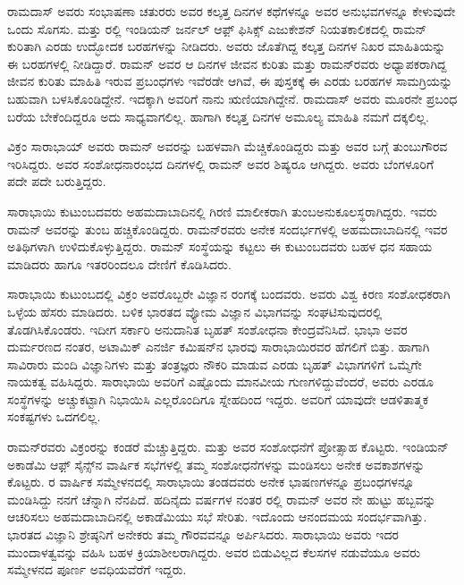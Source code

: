 ರಾಮದಾಸ್ ಅವರು ಸಂಭಾಷಣಾ ಚತುರರು ಅವರ ಕಲ್ಕತ್ತ ದಿನಗಳ ಕಥೆಗಳನ್ನೂ ಅವರ ಅನುಭವಗಳನ್ನೂ ಕೇಳುವುದೇ ಒಂದು ಸೊಗಸು.  ಮತ್ತು ರಲ್ಲಿ ಇಂಡಿಯನ್ ಜರ್ನಲ್ ಆಫ಼್ ಫಿಸಿಕ್ಸ್ ಎಜುಕೇಶನ್ ನಿಯತಕಾಲಿಕದಲ್ಲಿ ರಾಮನ್ ಕುರಿತಾಗಿ ಎರಡು ಉದ್ಭೋದಕ ಬರಹಗಳನ್ನು ನೀಡಿದರು. ಅವರು ಜೊತೆಗಿದ್ದ ಕಲ್ಕತ್ತ ದಿನಗಳ ನಿಖರ ಮಾಹಿತಿಯನ್ನು ಈ ಬರಹಗಳಲ್ಲಿ ನೀಡಿದ್ದಾರೆ. ರಾಮನ್ ಅವರ ಆ ದಿನಗಳ ಜೀವನ ಕುರಿತು ಮತ್ತು ರಾಮನ್‍ರವರು ಅಧ್ಯಾಪಕರಾಗಿದ್ದ ಜೀವನ ಕುರಿತು ಮಾಹಿತಿ ಇರುವ ಪ್ರಬಂಧಗಳು ಇವೆರಡೇ ಆಗಿವೆ, ಈ ಪುಸ್ತಕಕ್ಕೆ ಈ ಎರಡು ಬರಹಗಳ ಸಾಮಗ್ರಿಯನ್ನು ಬಹುವಾಗಿ ಬಳಸಿಕೊಂಡಿದ್ದೇನೆ. ಇದಕ್ಕಾಗಿ ಅವರಿಗೆ ನಾನು ಋಣಿಯಾಗಿದ್ದೇನೆ. ರಾಮದಾಸ್ ಅವರು ಮೂರನೇ ಪ್ರಬಂಧ ಬರೆಯ ಬೇಕೆಂದಿದ್ದರೂ ಅದು ಸಾಧ್ಯವಾಗಲಿಲ್ಲ. ಹಾಗಾಗಿ ಕಲ್ಕತ್ತ ದಿನಗಳ ಅಮೂಲ್ಯ ಮಾಹಿತಿ ನಮಗೆ ದಕ್ಕಲಿಲ್ಲ.



ವಿಕ್ರಂ ಸಾರಾಭಾಯ್ ಅವರು ರಾಮನ್ ಅವರನ್ನು ಬಹಳವಾಗಿ ಮೆಚ್ಚಿಕೊಂಡಿದ್ದರು ಮತ್ತು ಅವರ ಬಗ್ಗೆ ತುಂಬುಗೌರವ ಇರಿಸಿದ್ದರು. ಅವರ ಸಂಶೋಧನಾರಂಭದ ದಿನಗಳಲ್ಲಿ ರಾಮನ್ ಅವರ ಶಿಷ್ಯರೂ ಆಗಿದ್ದರು. ಅವರು ಬೆಂಗಳೂರಿಗೆ ಪದೇ ಪದೇ ಬರುತ್ತಿದ್ದರು.

ಸಾರಾಭಾಯಿ ಕುಟುಂಬದವರು ಅಹಮದಾಬಾದಿನಲ್ಲಿ ಗಿರಣಿ ಮಾಲೀಕರಾಗಿ ತುಂಬ\break ಅನುಕೂಲಸ್ಥರಾಗಿದ್ದರು. ಇವರು ರಾಮನ್ ಅವರನ್ನು ತುಂಬ ಹಚ್ಚಿಕೊಂಡಿದ್ದರು. ರಾಮನ್‍ರವರು ಅನೇಕ ಸಂದರ್ಭಗಳಲ್ಲಿ ಅಹಮದಾಬಾದಿನಲ್ಲಿ ಇವರ ಅತಿಥಿಗಳಾಗಿ ಉಳಿದುಕೊಳ್ಳುತ್ತಿದ್ದರು. ರಾಮನ್ ಸಂಸ್ಥೆಯನ್ನು ಕಟ್ಟಲು ಈ ಕುಟುಂಬದವರು ಬಹಳ ಧನ ಸಹಾಯ ಮಾಡಿದರು ಹಾಗೂ ಇತರರಿಂದಲೂ ದೇಣಿಗೆ ಕೊಡಿಸಿದರು.

ಸಾರಾಭಾಯಿ ಕುಟುಂಬದಲ್ಲಿ ವಿಕ್ರಂ ಅವರೊಬ್ಬರೇ ವಿಜ್ಞಾನ ರಂಗಕ್ಕೆ ಬಂದವರು. ಅವರು ವಿಶ್ವ ಕಿರಣ ಸಂಶೋಧಕರಾಗಿ ಒಳ್ಳೆಯ ಹೆಸರು ಮಾಡಿದರು. ಬಳಿಕ ಭಾರತದ ವ್ಯೋಮ ವಿಜ್ಞಾನ ವಿಭಾಗವನ್ನು ಸಂಘಟಿಸುವುದರಲ್ಲಿ ತೊಡಗಿಸಿಕೊಂಡರು. ಇದೀಗ ಸರ್ಕಾರಿ ಅನುದಾನಿತ ಬೃಹತ್ ಸಂಶೋಧನಾ ಕೇಂದ್ರವೆನಿಸಿದೆ. ಭಾಭಾ ಅವರ ದುರ್ಮರಣದ ನಂತರ, ಅಟಾಮಿಕ್ ಎನರ್ಜಿ ಕಮಿಷನ್‍ನ ಭಾರವು ಸಾರಾಭಾಯಿರವರ ಹೆಗಲಿಗೆ ಬಿತ್ತು. ಹಾಗಾಗಿ ಸಾವಿರಾರು ಮಂದಿ ವಿಜ್ಞಾನಿಗಳು ಮತ್ತು ತಂತ್ರಜ್ಞರು ನೌಕರಿ ಮಾಡುವ ಎರಡು ಬೃಹತ್ ವಿಭಾಗಗಳಿಗೆ ಒಮ್ಮೆಗೇ ನಾಯಕತ್ವ ವಹಿಸಿದ್ದರು. ಸಾರಾಭಾಯಿ ಅವರಿಗೆ ಎಷ್ಟೊಂದು ಮಾನವೀಯ ಗುಣಗಳಿದ್ದುವೆಂದರೆ, ಅವರು ಎರಡೂ ಸಂಸ್ಥೆಗಳನ್ನು ಅಚ್ಚುಕಟ್ಟಾಗಿ ನಿಭಾಯಿಸಿ ಎಲ್ಲರೊಂದಿಗೂ ಸ್ನೇಹದಿಂದ ಇದ್ದರು. ಅವರಿಗೆ ಯಾವುದೇ ಆಡಳಿತಾತ್ಮಕ ಸಂಕಷ್ಟಗಳು ಒದಗಲಿಲ್ಲ.

ರಾಮನ್‍ರವರು ವಿಕ್ರಂರನ್ನು ಕಂಡರೆ ಮೆಚ್ಚುತ್ತಿದ್ದರು. ಮತ್ತು ಅವರ ಸಂಶೋಧನೆಗೆ ಪ್ರೋತ್ಸಾಹ ಕೊಟ್ಟರು. ಇಂಡಿಯನ್ ಅಕಾಡೆಮಿ ಆಫ಼್ ಸೈನ್ಸ್‌ನ ವಾರ್ಷಿಕ ಸಭೆಗಳಲ್ಲಿ ತಮ್ಮ ಸಂಶೋಧನೆಗಳನ್ನು ಮಂಡಿಸಲು ಅನೇಕ ಅವಕಾಶಗಳನ್ನು ಕೊಟ್ಟರು. ರ ವಾರ್ಷಿಕ ಸಮ್ಮೇಳನದಲ್ಲಿ ಸಾರಾಭಾಯಿ ತಂಡದವರು ಅನೇಕ ಭಾಷಣಗಳನ್ನೂ ಪ್ರಬಂಧಗಳನ್ನೂ ಮಂಡಿಸಿದ್ದು ನನಗೆ ಚೆನ್ನಾಗಿ ನೆನಪಿದೆ. ಹದಿನೈದು ವರ್ಷಗಳ ನಂತರ ರಲ್ಲಿ ರಾಮನ್ ಅವರ ನೇ ಹುಟ್ಟು ಹಬ್ಬವನ್ನು ಆಚರಿಸಲು ಅಹಮದಾಬಾದಿನಲ್ಲಿ ಅಕಾಡೆಮಿಯು ಸಭೆ ಸೇರಿತು. ಇದೊಂದು ಆನಂದಮಯ ಸಂದರ್ಭವಾಗಿತ್ತು. ಭಾರತದ ವಿಜ್ಞಾನಿ ಶ್ರೇಷ್ಠನಿಗೆ ಅನೇಕರು ತಮ್ಮ ಗೌರವವನ್ನೂ ಅರ್ಪಿಸಿದರು. ಸಾರಾಭಾಯಿ ಅವರು ಇದರ ಮುಂದಾಳತ್ವವನ್ನು ವಹಿಸಿ ಬಹಳ ಕ್ರಿಯಾಶೀಲರಾಗಿದ್ದರು. ಅವರ ಬಿಡುವಿಲ್ಲದ ಕೆಲಸಗಳ ನಡುವೆಯೂ ಅವರು ಸಮ್ಮೇಳನದ ಪೂರ್ಣ ಅವಧಿಯವೆರೆಗೆ ಇದ್ದರು.

